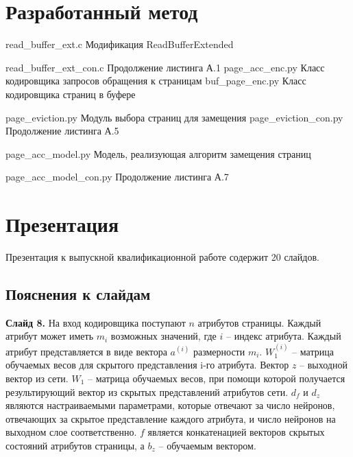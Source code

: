 \begin{appendices}
	\chapter{Разработанный метод}
	{read_buffer_ext.c} %
	{Модификация ReadBufferExtended} %
	
	{read_buffer_ext_con.c} %
	{Продолжение листинга А.1} %
\newpage
	{page_acc_enc.py} %
	{Класс кодировщика запросов обращения к страницам} %
\newpage
	{buf_page_enc.py} %
	{Класс кодировщика страниц в буфере} %

	{page_eviction.py} %
	{Модуль выбора страниц для замещения} %
\newpage
	{page_eviction_con.py} %
	{Продолжение листинга А.5} %

	{page_acc_model.py} %
	{Модель, реализующая алгоритм замещения страниц} %

	{page_acc_model_con.py} %
	{Продолжение листинга А.7} %


	\chapter{Презентация}
	Презентация к выпускной квалификационной работе содержит 20 слайдов.
	
	\newpage
	\section*{Пояснения к слайдам}
	\setcounter{page}{19}
	\textbf{Слайд 8.}
	На вход кодировщика поступают $n$ атрибутов страницы.
	Каждый атрибут может иметь $m_i$ возможных значений, где $i$ -- индекс атрибута.
	Каждый атрибут представляется в виде вектора $a^{(i)}$ размерности $m_i$.
	$W_1^{(i)}$ -- матрица обучаемых весов для скрытого представления i-го атрибута.
	Вектор $z$ -- выходной вектор из сети.
	$W_1$ -- матрица обучаемых весов, при помощи которой получается результирующий вектор из скрытых представлений атрибутов сети.
	$d_f$ и $d_z$ являются настраиваемыми параметрами, которые отвечают за число нейронов, отвечающих за скрытое представление каждого атрибута, и число нейронов на выходном слое соответственно.
	$f$ является конкатенацией векторов скрытых состояний атрибутов страницы, а $b_z$ -- обучаемым вектором.
	

\end{appendices}
